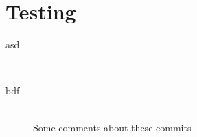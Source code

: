 
\chapter{Testing}

\begin{description}
    \item[asd] \hfill \\
    \item[bdf] \hfill \\
        Some comments about these commits
\end{description}

